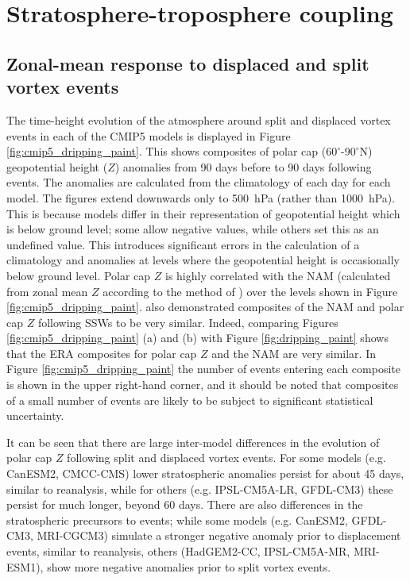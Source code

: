 \section{Stratosphere-troposphere coupling}
\subsection{Zonal-mean response to displaced and split vortex events}

The time-height evolution of the atmosphere around split and displaced vortex
events in each of the CMIP5 models is displayed in Figure
\ref{fig:cmip5_dripping_paint}. This shows composites of polar cap
($60^{\circ}$-$90^{\circ}$N) geopotential height ($Z$) anomalies from 90 days
before to 90 days following events. The anomalies are calculated from the
climatology of each day for each model. The figures extend downwards only to
500~hPa (rather than 1000~hPa). This is because models differ in their
representation of geopotential height which is below ground level; some allow
negative values, while others set this as an undefined value. This introduces
significant errors in the calculation of a climatology and anomalies at levels
where the geopotential height is occasionally below ground level. Polar cap $Z$
is highly correlated with the NAM (calculated from zonal mean $Z$ according to
the method of \citet{Baldwin2009}) over the levels shown in Figure
\ref{fig:cmip5_dripping_paint}. \citet{Kushner2010} also demonstrated composites
of the NAM and polar cap $Z$ following SSWs to be very similar. Indeed,
comparing Figures \ref{fig:cmip5_dripping_paint} (a) and (b) with Figure
\ref{fig:dripping_paint} shows that the ERA composites for polar cap $Z$ and the
NAM are very similar. In Figure \ref{fig:cmip5_dripping_paint} the number of
events entering each composite is shown in the upper right-hand corner, and it
should be noted that composites of a small number of events are likely to be
subject to significant statistical uncertainty.

It can be seen that there are large inter-model differences in the evolution of
polar cap $Z$ following split and displaced vortex events. For some models
(e.g. CanESM2, CMCC-CMS) lower stratospheric anomalies persist for about 45
days, similar to reanalysis, while for others (e.g. IPSL-CM5A-LR, GFDL-CM3)
these persist for much longer, beyond 60 days. There are also differences in the
stratospheric precursors to events; while some models (e.g. CanESM2, GFDL-CM3,
MRI-CGCM3) simulate a stronger negative anomaly prior to displacement events,
similar to reanalysis, others (HadGEM2-CC, IPSL-CM5A-MR, MRI-ESM1), show more
negative anomalies prior to split vortex events. 

